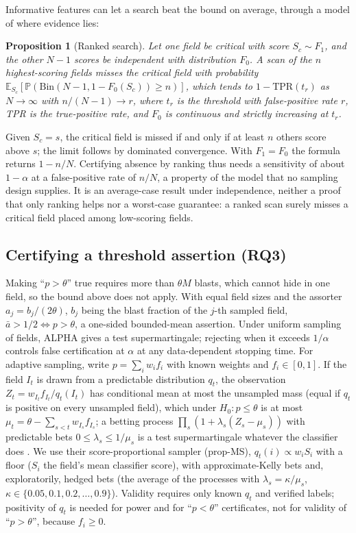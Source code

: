 \documentclass[journal]{IEEEtran}
\newtheorem{proposition}{Proposition}
\newcommand{\Prb}{\mathbb{P}}
\newcommand{\E}{\mathbb{E}}
\begin{document}
Informative features can let a search beat the bound on average, through a model of where evidence lies:
\begin{proposition}[Ranked search]\label{prop:bridge}
Let one field be critical with score $S_c\sim F_1$, and the other $N-1$ scores be independent with distribution $F_0$. A scan of the $n$ highest-scoring fields misses the critical field with probability $\E_{S_c}[\Prb(\mathrm{Bin}(N-1,1-F_0(S_c))\ge n)]$, which tends to $1-\mathrm{TPR}(t_r)$ as $N\to\infty$ with $n/(N-1)\to r$, where $t_r$ is the threshold with false-positive rate $r$, TPR is the true-positive rate, and $F_0$ is continuous and strictly increasing at $t_r$.
\end{proposition}
Given $S_c=s$, the critical field is missed if and only if at least $n$ others score above $s$; the limit follows by dominated convergence. With $F_1=F_0$ the formula returns $1-n/N$. Certifying absence by ranking thus needs a sensitivity of about $1-\alpha$ at a false-positive rate of $n/N$, a property of the model that no sampling design supplies. It is an average-case result under independence, neither a proof that only ranking helps nor a worst-case guarantee: a ranked scan surely misses a critical field placed among low-scoring fields.

\subsection{Certifying a threshold assertion (RQ3)}
Making ``$p>\theta$'' true requires more than $\theta M$ blasts, which cannot hide in one field, so the bound above does not apply. With equal field sizes and the assorter $a_j=b_j/(2\theta)$, $b_j$ being the blast fraction of the $j$-th sampled field, $\bar a>1/2\iff p>\theta$, a one-sided bounded-mean assertion. Under uniform sampling of fields, ALPHA \cite{stark2023alpha} gives a test supermartingale; rejecting when it exceeds $1/\alpha$ controls false certification at $\alpha$ at any data-dependent stopping time. For adaptive sampling, write $p=\sum_iw_if_i$ with known weights and $f_i\in[0,1]$. If the field $I_t$ is drawn from a predictable distribution $q_t$, the observation $Z_t=w_{I_t}f_{I_t}/q_t(I_t)$ has conditional mean at most the unsampled mass (equal if $q_t$ is positive on every unsampled field), which under $H_0:p\le\theta$ is at most $\mu_t=\theta-\sum_{s<t}w_{I_s}f_{I_s}$; a betting process $\prod_s(1+\lambda_s(Z_s-\mu_s))$ with predictable bets $0\le\lambda_s\le1/\mu_s$ is a test supermartingale whatever the classifier does \cite{shekhar2023rlfa}. We use their score-proportional sampler (prop-MS), $q_t(i)\propto w_iS_i$ with a floor ($S_i$ the field's mean classifier score), with approximate-Kelly bets and, exploratorily, hedged bets (the average of the processes with $\lambda_s=\kappa/\mu_s$, $\kappa\in\{0.05,0.1,0.2,\dots,0.9\}$). Validity requires only known $q_t$ and verified labels; positivity of $q_t$ is needed for power and for ``$p<\theta$'' certificates, not for validity of ``$p>\theta$'', because $f_i\ge0$.
\end{document}
